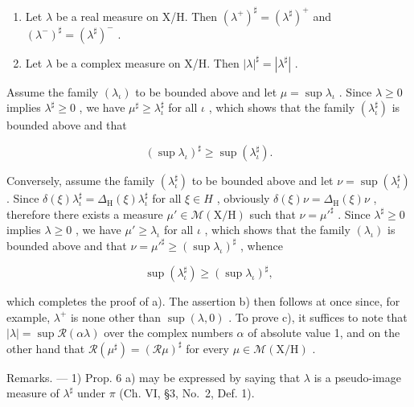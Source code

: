 \begin{enumerate}
\def\labelenumi{\alph{enumi})}
\setcounter{enumi}{1}
\item
  Let \(\lambda\) be a real measure on X/H. Then \((\lambda^{+})^{\sharp} = (\lambda^{\sharp})^{+}\) and \((\lambda^{-})^{\sharp} = (\lambda^{\sharp})^{-}\) .
\item
  Let \(\lambda\) be a complex measure on X/H. Then \(|\lambda|^{\sharp} = |\lambda^{\sharp}|\) .
\end{enumerate}

Assume the family \((\lambda_{\iota})\) to be bounded above and let \(\mu = \sup \lambda_{\iota}\) . Since \(\lambda \geqslant 0\) implies \(\lambda^{\sharp} \geqslant 0\) , we have \(\mu^{\sharp} \geqslant \lambda_{\iota}^{\sharp}\) for all \(\iota\) , which shows that the family \((\lambda_{\iota}^{\sharp})\) is bounded above and that

\[
(\sup \lambda_ {\iota}) ^ {\sharp} \geqslant \sup (\lambda_ {\iota} ^ {\sharp}).
\]

Conversely, assume the family \((\lambda_{\iota}^{\sharp})\) to be bounded above and let \(\nu = \sup(\lambda_{\iota}^{\sharp})\) . Since \(\delta(\xi)\lambda_{\iota}^{\sharp} = \Delta_{\mathrm{H}}(\xi)\lambda_{\iota}^{\sharp}\) for all \(\xi \in H\) , obviously \(\delta(\xi)\nu = \Delta_{\mathrm{H}}(\xi)\nu\) , therefore there exists a measure \(\mu' \in \mathcal{M}(\mathrm{X}/\mathrm{H})\) such that \(\nu = \mu'^{\sharp}\) . Since \(\lambda^{\sharp} \geqslant 0\) implies \(\lambda \geqslant 0\) , we have \(\mu' \geqslant \lambda_{\iota}\) for all \(\iota\) , which shows that the family \((\lambda_{\iota})\) is bounded above and that \(\nu = \mu'^{\sharp} \geqslant (\sup \lambda_{\iota})^{\sharp}\) , whence

\[
\sup \left(\lambda_ {\iota} ^ {\sharp}\right) \geqslant \left(\sup \lambda_ {\iota}\right) ^ {\sharp},
\]

which completes the proof of a). The assertion b) then follows at once since, for example, \(\lambda^{+}\) is none other than \(\sup(\lambda,0)\) . To prove c), it suffices to note that \(|\lambda| = \sup \mathcal{R}(\alpha \lambda)\) over the complex numbers \(\alpha\) of absolute value 1, and on the other hand that \(\mathcal{R}(\mu^{\sharp}) = (\mathcal{R}\mu)^{\sharp}\) for every \(\mu \in \mathcal{M}(\mathrm{X / H})\) .

Remarks. --- 1) Prop. 6 a) may be expressed by saying that \(\lambda\) is a pseudo-image measure of \(\lambda^{\sharp}\) under \(\pi\) (Ch. VI, §3, No.~2, Def. 1).

